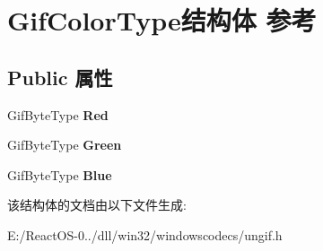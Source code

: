 \hypertarget{struct_gif_color_type}{}\section{Gif\+Color\+Type结构体 参考}
\label{struct_gif_color_type}
\subsection*{Public 属性}
\begin{DoxyCompactItemize}
\item 
\mbox{\label{struct_gif_color_type_af7b70b3125a8eb922315b2dd5377a13a}} 
Gif\+Byte\+Type {\bfseries Red}
\item 
\mbox{\label{struct_gif_color_type_a336c86710882955126128c65e11f290c}} 
Gif\+Byte\+Type {\bfseries Green}
\item 
\mbox{\label{struct_gif_color_type_a09107fe422a82f2f6b38ad498a4f674d}} 
Gif\+Byte\+Type {\bfseries Blue}
\end{DoxyCompactItemize}


该结构体的文档由以下文件生成\+:\begin{DoxyCompactItemize}
\item 
E\+:/\+React\+O\+S-\/0../dll/win32/windowscodecs/ungif.\+h\end{DoxyCompactItemize}
